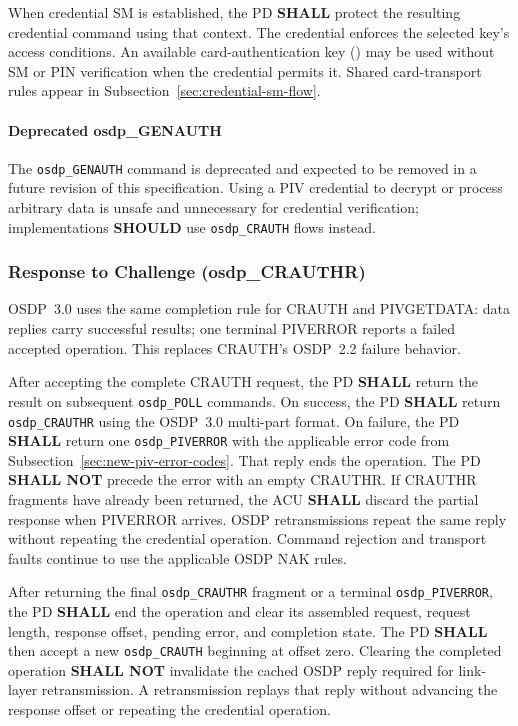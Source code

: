 

When credential SM is established, the PD \textbf{SHALL} protect the resulting
credential command using that context. The credential enforces the selected key's
access conditions. An available card-authentication key () may be
used without SM or PIN verification when the credential permits it. Shared
card-transport rules appear in Subsection~\ref{sec:credential-sm-flow}.

\paragraph{Deprecated osdp\_GENAUTH} The \texttt{osdp\_GENAUTH} command is deprecated and expected to be removed in a future revision of this specification. Using a PIV credential to decrypt or process arbitrary data is unsafe and unnecessary for credential verification; implementations \textbf{SHOULD} use \texttt{osdp\_CRAUTH} flows instead.

\subsubsection{Response to Challenge (osdp\_CRAUTHR)}

OSDP~3.0 uses the same completion rule for CRAUTH and PIVGETDATA:
data replies carry successful results; one terminal PIVERROR reports a
failed accepted operation. This replaces CRAUTH's OSDP~2.2 failure behavior.

After accepting the complete CRAUTH request, the PD \textbf{SHALL} return
the result on subsequent \texttt{osdp\_POLL} commands. On success, the PD
\textbf{SHALL} return \texttt{osdp\_CRAUTHR} using the OSDP~3.0 multi-part
format. On failure, the PD \textbf{SHALL} return one
\texttt{osdp\_PIVERROR} with the applicable error code from
Subsection~\ref{sec:new-piv-error-codes}. That reply ends the operation.
The PD \textbf{SHALL NOT} precede the error with an empty CRAUTHR.
If CRAUTHR fragments have already been returned, the ACU \textbf{SHALL}
discard the partial response when PIVERROR arrives. OSDP retransmissions
repeat the same reply without repeating the credential operation.
Command rejection and transport faults continue to use the applicable
OSDP NAK rules.

After returning the final \texttt{osdp\_CRAUTHR} fragment or a terminal
\texttt{osdp\_PIVERROR}, the PD \textbf{SHALL} end the operation and clear its
assembled request, request length, response offset, pending error, and completion
state. The PD \textbf{SHALL} then accept a new \texttt{osdp\_CRAUTH} beginning at
offset zero. Clearing the completed operation \textbf{SHALL NOT} invalidate the
cached OSDP reply required for link-layer retransmission. A retransmission replays
that reply without advancing the response offset or repeating the credential
operation.

